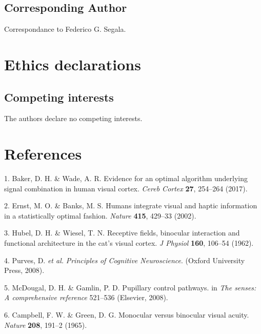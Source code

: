 \documentclass[
]{article}
\begin{document}
\hypertarget{corresponding-author}{%
\subsection{Corresponding Author}\label{corresponding-author}}

Correspondance to Federico G. Segala.

\hypertarget{ethics-declarations}{%
\section{Ethics declarations}\label{ethics-declarations}}

\hypertarget{competing-interests}{%
\subsection{Competing interests}\label{competing-interests}}

The authors declare no competing interests.

\hypertarget{references}{%
\section*{References}\label{references}}

\hypertarget{refs}{}
\leavevmode\hypertarget{ref-Baker2017}{}%
1. Baker, D. H. \& Wade, A. R. Evidence for an optimal algorithm underlying signal combination in human visual cortex. \emph{Cereb Cortex} \textbf{27}, 254--264 (2017).

\leavevmode\hypertarget{ref-Ernst2002}{}%
2. Ernst, M. O. \& Banks, M. S. Humans integrate visual and haptic information in a statistically optimal fashion. \emph{Nature} \textbf{415}, 429--33 (2002).

\leavevmode\hypertarget{ref-Hubel1962}{}%
3. Hubel, D. H. \& Wiesel, T. N. Receptive fields, binocular interaction and functional architecture in the cat's visual cortex. \emph{J Physiol} \textbf{160}, 106--54 (1962).

\leavevmode\hypertarget{ref-Purves2008}{}%
4. Purves, D. \emph{et al.} \emph{Principles of Cognitive Neuroscience}. (Oxford University Press, 2008).

\leavevmode\hypertarget{ref-McDougal2008}{}%
5. McDougal, D. H. \& Gamlin, P. D. Pupillary control pathways. in \emph{The senses: A comprehensive reference} 521--536 (Elsevier, 2008).

\leavevmode\hypertarget{ref-Campbell1965}{}%
6. Campbell, F. W. \& Green, D. G. Monocular versus binocular visual acuity. \emph{Nature} \textbf{208}, 191--2 (1965).
\end{document}
